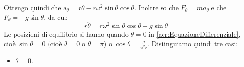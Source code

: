 \documentclass[../main.tex]{subfiles}
\begin{document}
Ottengo quindi che $a_\theta=r\ddot{\theta}-r\omega^2\sin\theta\cos\theta$.
Inoltre so che $F_\theta=m a_\theta$ e che $F_\theta=-g\sin\theta$, da cui:
\begin{equation}\label{acr:EquazioneDifferenziale}
	r\ddot{\theta}=r\omega^2\sin\theta\cos\theta-g\sin\theta
\end{equation}
Le posizioni di equilibrio si hanno quando $\ddot\theta=0$ in \cref{acr:EquazioneDifferenziale}, cioè
$\sin\theta=0$ (cioè $\theta=0$ o $\theta=\pi$) o $\cos\theta=\frac{g}{\omega^2r}$. Distinguiamo quindi tre casi:
\begin{itemize}
	\item $\theta=0$.
\end{itemize}



\solution[2]
\end{document}
